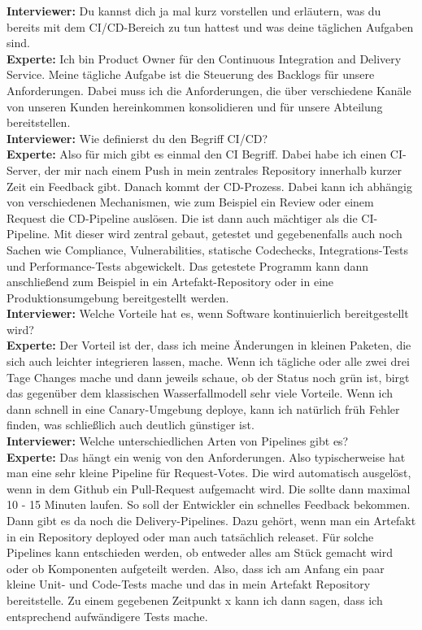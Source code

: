 \begin{linenumbers}
\textbf{Interviewer:} Du kannst dich ja mal kurz vorstellen und erläutern, was du bereits mit dem CI/CD-Bereich zu tun hattest und was deine täglichen Aufgaben sind.\\
\textbf{Experte:} Ich bin Product Owner für den Continuous Integration and Delivery Service. Meine tägliche Aufgabe ist die Steuerung des Backlogs für unsere Anforderungen. Dabei muss ich die Anforderungen, die über verschiedene Kanäle von unseren Kunden hereinkommen konsolidieren und für unsere Abteilung bereitstellen.\\
\textbf{Interviewer:} Wie definierst du den Begriff CI/CD?\\
\textbf{Experte:} Also für mich gibt es einmal den CI Begriff. Dabei habe ich einen CI-Server, der mir nach einem Push in mein zentrales Repository innerhalb kurzer Zeit ein Feedback gibt. Danach kommt der CD-Prozess. Dabei kann ich abhängig von verschiedenen Mechanismen, wie zum Beispiel ein Review oder einem Request die CD-Pipeline auslösen. Die ist dann auch mächtiger als die CI-Pipeline. Mit dieser wird zentral gebaut, getestet und gegebenenfalls auch noch Sachen wie Compliance, Vulnerabilities, statische Codechecks, Integrations-Tests und Performance-Tests abgewickelt. Das getestete Programm kann dann anschließend zum Beispiel in ein Artefakt-Repository oder in eine Produktionsumgebung bereitgestellt werden.\\
\textbf{Interviewer:} Welche Vorteile hat es, wenn Software kontinuierlich bereitgestellt wird?\\
\textbf{Experte:} Der Vorteil ist der, dass ich meine Änderungen in kleinen Paketen, die sich auch leichter integrieren lassen, mache. Wenn ich tägliche oder alle zwei drei Tage Changes mache und dann jeweils schaue, ob der Status noch grün ist, birgt das gegenüber dem klassischen Wasserfallmodell sehr viele Vorteile. Wenn ich dann schnell in eine Canary-Umgebung deploye, kann ich natürlich früh Fehler finden, was schließlich auch deutlich günstiger ist.\\
\textbf{Interviewer:} Welche unterschiedlichen Arten von Pipelines gibt es?\\
\textbf{Experte:} Das hängt ein wenig von den Anforderungen. Also typischerweise hat man eine sehr kleine Pipeline für Request-Votes. Die wird automatisch ausgelöst, wenn in dem Github ein Pull-Request aufgemacht wird. Die sollte dann maximal 10 - 15 Minuten laufen. So soll der Entwickler ein schnelles Feedback bekommen. Dann gibt es da noch die Delivery-Pipelines. Dazu gehört, wenn man ein Artefakt in ein Repository deployed oder man auch tatsächlich releaset. Für solche Pipelines kann entschieden werden, ob entweder alles am Stück gemacht wird oder ob Komponenten aufgeteilt werden. Also, dass ich am Anfang ein paar kleine Unit- und Code-Tests mache und das in mein Artefakt Repository bereitstelle. Zu einem gegebenen Zeitpunkt x kann ich dann sagen, dass ich entsprechend aufwändigere Tests mache.\\

\end{linenumbers}
